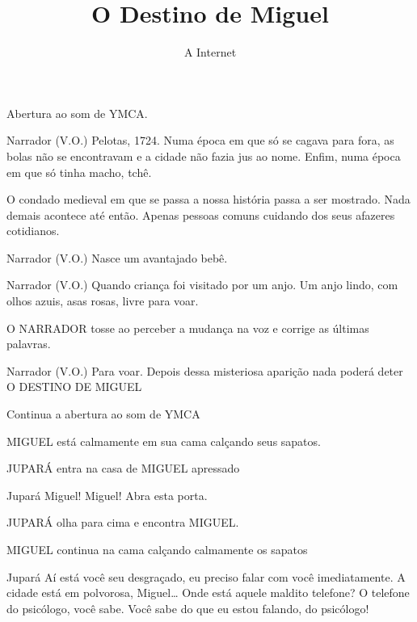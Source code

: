 \documentclass{screenplay}
\title{O Destino de Miguel}
\author{A Internet}
\begin{document}
\coverpage
\fadein

Abertura ao som de YMCA.

\begin{dialogue}{Narrador (V.O.)}
    Pelotas, 1724. Numa época em que só se cagava para fora, as bolas não se encontravam e a cidade não fazia jus ao nome. Enfim, numa época em que só tinha macho, tchê.
\end{dialogue}

O condado medieval em que se passa a nossa história passa a ser mostrado. Nada demais acontece até então. Apenas pessoas comuns cuidando dos seus afazeres cotidianos.

\begin{dialogue}{Narrador (V.O.)}
    Nasce um avantajado bebê.
\end{dialogue}

\begin{dialogue}{Narrador (V.O.)}
    Quando criança foi visitado por um anjo. Um anjo lindo, com olhos azuis, asas rosas, livre para voar.
\end{dialogue}

O NARRADOR tosse ao perceber a mudança na voz e corrige as últimas palavras.

\begin{dialogue}{Narrador (V.O.)}
    Para voar.
    Depois dessa misteriosa aparição nada poderá deter O DESTINO DE MIGUEL
\end{dialogue}

Continua a abertura ao som de YMCA


MIGUEL está calmamente em sua cama calçando seus sapatos.

JUPARÁ entra na casa de MIGUEL apressado

\begin{dialogue}{Jupará}
    Miguel! Miguel! Abra esta porta.
\end{dialogue}

JUPARÁ olha para cima e encontra MIGUEL.

MIGUEL continua na cama calçando calmamente os sapatos

\begin{dialogue}{Jupará}
    Aí está você seu desgraçado, eu preciso falar com você imediatamente. A cidade está em polvorosa, Miguel\ldots 
    Onde está aquele maldito telefone? O telefone do psicólogo, você sabe.  Você sabe do que eu estou falando, do psicólogo!
\end{dialogue}
\end{document}
